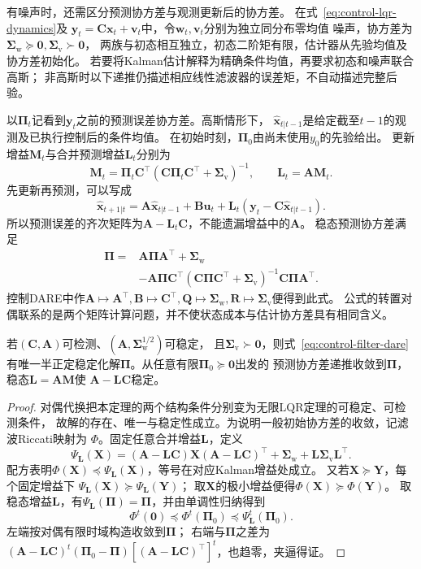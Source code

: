 有噪声时，还需区分预测协方差与观测更新后的协方差。
在式~\eqref{eq:control-lqr-dynamics}及
$\bm y_t=\bm C\bm x_t+\bm v_t$中，令$\bm w_t,\bm v_t$分别为独立同分布零均值
噪声，协方差为$\bm\Sigma_{\mathrm w}\succeq\bm0,\bm\Sigma_{\mathrm v}\succ\bm0$，
两族与初态相互独立，初态二阶矩有限，估计器从先验均值及协方差初始化。
若要将Kalman估计解释为精确条件均值，再要求初态和噪声联合高斯；
非高斯时以下递推仍描述相应线性滤波器的误差矩，不自动描述完整后验。

以$\bm\Pi_t$记看到$\bm y_t$之前的预测误差协方差。高斯情形下，
$\widehat{\bm x}_{t|t-1}$是给定截至$t-1$的观测及已执行控制后的条件均值。
在初始时刻，$\bm\Pi_0$由尚未使用$y_0$的先验给出。
更新增益$\bm M_t$与合并预测增益$\bm L_t$分别为
\[
  \bm M_t=\bm\Pi_t\bm C^\top
       (\bm C\bm\Pi_t\bm C^\top+\bm\Sigma_{\mathrm v})^{-1},
  \qquad \bm L_t=\bm A\bm M_t.
\]
先更新再预测，可以写成
\[
  \widehat{\bm x}_{t+1|t}
  =\bm A\widehat{\bm x}_{t|t-1}+\bm B\bm u_t+
       \bm L_t(\bm y_t-\bm C\widehat{\bm x}_{t|t-1}).
\]
所以预测误差的齐次矩阵为$\bm A-\bm L_t\bm C$，不能遗漏增益中的$\bm A$。
稳态预测协方差满足
\begin{equation}
  \begin{aligned}
  \bm\Pi={}&\bm A\bm\Pi\bm A^\top+\bm\Sigma_{\mathrm w}\\
     &-\bm A\bm\Pi\bm C^\top
       (\bm C\bm\Pi\bm C^\top+\bm\Sigma_{\mathrm v})^{-1}
       \bm C\bm\Pi\bm A^\top.
  \end{aligned}
  \label{eq:control-filter-dare}
\end{equation}
控制DARE中作$\bm A\mapsto\bm A^\top,\bm B\mapsto\bm C^\top,
\bm Q\mapsto\bm\Sigma_{\mathrm w},\bm R\mapsto\bm\Sigma_{\mathrm v}$便得到此式。
公式的转置对偶联系的是两个矩阵计算问题，并不使状态成本与估计协方差具有相同含义。

\begin{theorem}[稳态预测滤波的充分条件]
\label{thm:control-steady-filter}
若$(\bm C,\bm A)$可检测、$(\bm A,\bm\Sigma_{\mathrm w}^{1/2})$可稳定，
且$\bm\Sigma_{\mathrm v}\succ\bm0$，则式~\eqref{eq:control-filter-dare}
有唯一半正定稳定化解$\bm\Pi$。从任意有限$\bm\Pi_0\succeq\bm0$出发的
预测协方差递推收敛到$\bm\Pi$，稳态$\bm L=\bm A\bm M$使
$\bm A-\bm L\bm C$稳定。
\end{theorem}
\begin{proof}
对偶代换把本定理的两个结构条件分别变为无限LQR定理的可稳定、可检测条件，
故解的存在、唯一与稳定性成立。为说明一般初始协方差的收敛，记滤波Riccati映射为
$\Phi$。固定任意合并增益$\bm L$，定义
\[
  \Psi_{\bm L}(\bm X)
  =(\bm A-\bm L\bm C)\bm X(\bm A-\bm L\bm C)^\top+
     \bm\Sigma_{\mathrm w}+\bm L\bm\Sigma_{\mathrm v}\bm L^\top.
\]
配方表明$\Phi(\bm X)\preceq\Psi_{\bm L}(\bm X)$，等号在对应Kalman增益处成立。
又若$\bm X\succeq\bm Y$，每个固定增益下
$\Psi_{\bm L}(\bm X)\succeq\Psi_{\bm L}(\bm Y)$；
取$\bm X$的极小增益便得$\Phi(\bm X)\succeq\Phi(\bm Y)$。
取稳态增益$\bm L$，有$\Psi_{\bm L}(\bm\Pi)=\bm\Pi$，并由单调性归纳得到
\[
  \Phi^t(\bm0)\preceq\Phi^t(\bm\Pi_0)
                     \preceq\Psi_{\bm L}^t(\bm\Pi_0).
\]
左端按对偶有限时域构造收敛到$\bm\Pi$；
右端与$\bm\Pi$之差为
$(\bm A-\bm L\bm C)^t(\bm\Pi_0-\bm\Pi)
 [(\bm A-\bm L\bm C)^\top]^t$，也趋零，夹逼得证。
\end{proof}

